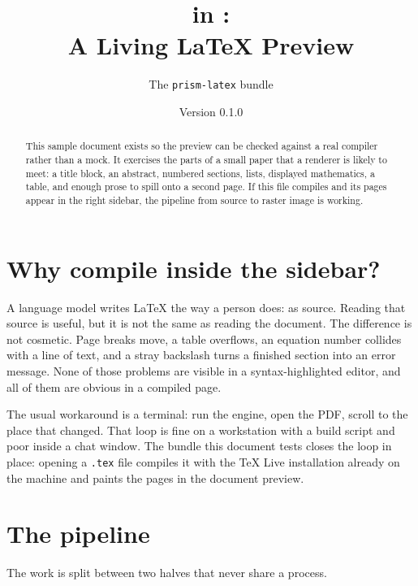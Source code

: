 \documentclass[11pt]{article}
\title{\prism{} in \dsh:\\ A Living \LaTeX{} Preview}
\author{The \texttt{prism-latex} bundle}
\date{Version 0.1.0}
\begin{document}
\maketitle

\begin{abstract}
This sample document exists so the preview can be checked against a real
compiler rather than a mock. It exercises the parts of a small paper that a
renderer is likely to meet: a title block, an abstract, numbered sections,
lists, displayed mathematics, a table, and enough prose to spill onto a second
page. If this file compiles and its pages appear in the right sidebar, the
pipeline from source to raster image is working.
\end{abstract}

\section{Why compile inside the sidebar?}

A language model writes \LaTeX{} the way a person does: as source. Reading that
source is useful, but it is not the same as reading the document. The difference
is not cosmetic. Page breaks move, a table overflows, an equation number
collides with a line of text, and a stray backslash turns a finished section
into an error message. None of those problems are visible in a syntax-highlighted
editor, and all of them are obvious in a compiled page.

The usual workaround is a terminal: run the engine, open the PDF, scroll to the
place that changed. That loop is fine on a workstation with a build script and
poor inside a chat window. The bundle this document tests closes the loop in
place: opening a \texttt{.tex} file compiles it with the TeX Live installation
already on the machine and paints the pages in the document preview.

\section{The pipeline}

The work is split between two halves that never share a process.
\end{document}
